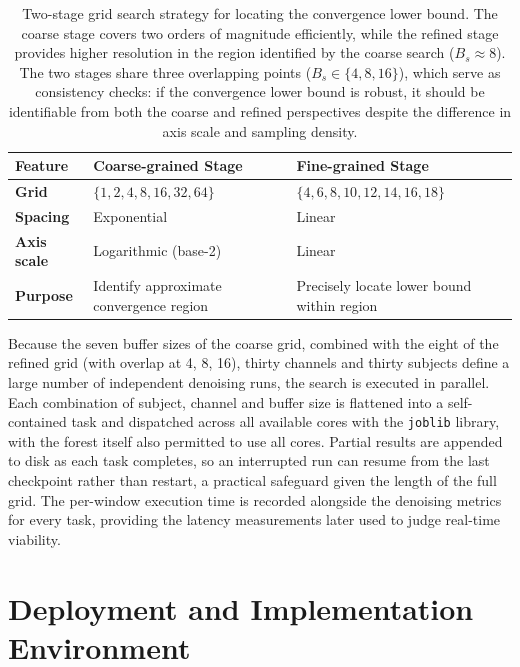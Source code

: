 \documentclass[MScCS,12pt,oneside,final]{uccthesis}
\begin{document}
\begin{table}[!htb]
    \centering
    \renewcommand{\arraystretch}{1.3}
    \begin{tabular}{@{} l p{5.2cm} p{5.2cm} @{}}
        \toprule
        \textbf{Feature} & \textbf{Coarse-grained Stage} & \textbf{Fine-grained Stage} \\
        \midrule
        \textbf{Grid} & $\{1,2,4,8,16,32,64\}$ & $\{4,6,8,10,12,14,16,18\}$ \\
        \textbf{Spacing} & Exponential & Linear \\
        \textbf{Axis scale} & Logarithmic (base-2) & Linear \\
        \textbf{Purpose} & Identify approximate convergence region & Precisely locate lower bound within region \\
        \bottomrule
    \end{tabular}
    \caption{Two-stage grid search strategy for locating the convergence lower bound. The 
coarse stage covers two orders of magnitude efficiently, while the refined stage provides 
higher resolution in the region identified by the coarse search ($B_s \approx 8$). The two stages share three overlapping points ($B_s \in \{4,8,16\}$), which serve as consistency checks: if the convergence lower bound is robust, it should be identifiable from both the coarse and refined perspectives despite the difference in axis scale and sampling density.}
    \label{tab:two_stage_grid}
\end{table}
Because the seven buffer sizes of the coarse grid, combined with the eight of the refined grid (with overlap at 4, 8, 16), thirty channels and thirty subjects define a large number of independent denoising runs, the search is executed in parallel. Each combination of subject, channel and buffer size is flattened into a self-contained task and dispatched across all available cores with the \texttt{joblib} library, with the forest itself also permitted to use all cores. Partial results are appended to disk as each task completes, so an interrupted run can resume from the last checkpoint rather than restart, a practical safeguard given the length of the full grid. The per-window execution time is recorded alongside the denoising metrics for every task, providing the latency measurements later used to judge real-time viability.

\section{Deployment and Implementation Environment}
\label{sec:deployment_environment}
 
\end{document}
